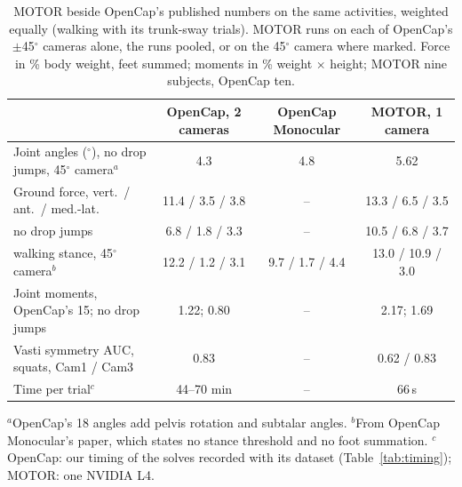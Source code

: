 \documentclass[11pt]{article}
\newcommand{\dg}{\ensuremath{^\circ}}
\begin{document}
\begin{table}[t]
\centering\footnotesize
\caption{MOTOR beside OpenCap's published numbers on the same activities, weighted equally (walking with its
trunk-sway trials). MOTOR runs on each of OpenCap's $\pm$45\dg{} cameras alone, the runs pooled, or on the 45\dg{}
camera where marked. Force in \% body weight, feet summed; moments in \% weight $\times$ height; MOTOR nine subjects,
OpenCap ten.}
\label{tab:headline}
\begin{tabular}{@{}lccc@{}}
\toprule
 & OpenCap, 2 cameras & OpenCap Monocular & MOTOR, 1 camera \\
\midrule
Joint angles (\dg), no drop jumps, 45\dg{} camera$^a$ & 4.3 & 4.8 & 5.62 \\
Ground force, vert.\ / ant.\ / med.-lat. & 11.4 / 3.5 / 3.8 & -- & 13.3 / 6.5 / 3.5 \\
\quad no drop jumps & 6.8 / 1.8 / 3.3 & -- & 10.5 / 6.8 / 3.7 \\
\quad walking stance, 45\dg{} camera$^b$ & 12.2 / 1.2 / 3.1 & 9.7 / 1.7 / 4.4 & 13.0 / 10.9 / 3.0 \\
Joint moments, OpenCap's 15; no drop jumps & 1.22; 0.80 & -- & 2.17; 1.69 \\
Vasti symmetry AUC, squats, Cam1 / Cam3 & 0.83 & -- & 0.62 / 0.83 \\
Time per trial$^c$ & 44--70 min & -- & 66\,s \\
\bottomrule
\end{tabular}
\par\smallskip\parbox{\linewidth}{\scriptsize $^a$OpenCap's 18 angles add pelvis rotation and subtalar angles. $^b$From OpenCap Monocular's paper, which states no stance threshold and no foot summation.
$^c$OpenCap: our timing of the solves recorded with its dataset (Table~\ref{tab:timing}); MOTOR: one NVIDIA L4.}
\end{table}
\end{document}
